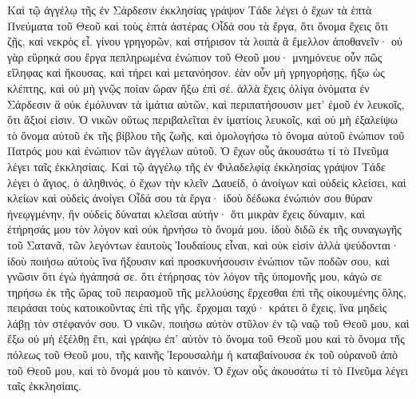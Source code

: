 \begin{pages}
    \begin{Rightside}
        \beginnumbering
		Καὶ τῷ ἀγγέλῳ τῆς ἐν Σάρδεσιν ἐκκλησίας γράψον  Τάδε λέγει ὁ ἔχων τὰ ἑπτὰ Πνεύματα τοῦ Θεοῦ καὶ τοὺς ἑπτὰ ἀστέρας Οἶδά σου τὰ ἔργα, ὅτι ὄνομα ἔχεις ὅτι ζῇς, καὶ νεκρὸς εἶ. γίνου γρηγορῶν, καὶ στήρισον τὰ λοιπὰ ἃ ἔμελλον ἀποθανεῖν· οὐ γὰρ εὕρηκά σου ἔργα πεπληρωμένα ἐνώπιον τοῦ Θεοῦ μου· μνημόνευε οὖν πῶς εἴληφας καὶ ἤκουσας, καὶ τήρει καὶ μετανόησον. ἐὰν οὖν μὴ γρηγορήσῃς, ἥξω ὡς κλέπτης, καὶ οὐ μὴ γνῷς ποίαν ὥραν ἥξω ἐπὶ σέ.
		\pend
		\pstart
		ἀλλὰ ἔχεις ὀλίγα ὀνόματα ἐν Σάρδεσιν ἃ οὐκ ἐμόλυναν τὰ ἱμάτια αὐτῶν, καὶ περιπατήσουσιν μετ’ ἐμοῦ ἐν λευκοῖς, ὅτι ἄξιοί εἰσιν. Ὁ νικῶν οὕτως περιβαλεῖται ἐν ἱματίοις λευκοῖς, καὶ οὐ μὴ ἐξαλείψω τὸ ὄνομα αὐτοῦ ἐκ τῆς βίβλου τῆς ζωῆς, καὶ ὁμολογήσω τὸ ὄνομα αὐτοῦ ἐνώπιον τοῦ Πατρός μου καὶ ἐνώπιον τῶν ἀγγέλων αὐτοῦ. Ὁ ἔχων οὖς ἀκουσάτω τί τὸ Πνεῦμα λέγει ταῖς ἐκκλησίαις.
		\pend
		\pstart
		Καὶ τῷ ἀγγέλῳ τῆς ἐν Φιλαδελφίᾳ ἐκκλησίας γράψον Τάδε λέγει ὁ ἅγιος, ὁ ἀληθινός, ὁ ἔχων τὴν κλεῖν Δαυείδ, ὁ ἀνοίγων καὶ οὐδεὶς κλείσει, καὶ κλείων καὶ οὐδεὶς ἀνοίγει Οἶδά σου τὰ ἔργα· ἰδοὺ δέδωκα ἐνώπιόν σου θύραν ἠνεῳγμένην, ἣν οὐδεὶς δύναται κλεῖσαι αὐτήν· ὅτι μικρὰν ἔχεις δύναμιν, καὶ ἐτήρησάς μου τὸν λόγον καὶ οὐκ ἠρνήσω τὸ ὄνομά μου. ἰδοὺ διδῶ ἐκ τῆς συναγωγῆς τοῦ Σατανᾶ, τῶν λεγόντων ἑαυτοὺς Ἰουδαίους εἶναι, καὶ οὐκ εἰσὶν ἀλλὰ ψεύδονται· ἰδοὺ ποιήσω αὐτοὺς ἵνα ἥξουσιν καὶ προσκυνήσουσιν ἐνώπιον τῶν ποδῶν σου, καὶ γνῶσιν ὅτι ἐγὼ ἠγάπησά σε. ὅτι ἐτήρησας τὸν λόγον τῆς ὑπομονῆς μου, κἀγώ σε τηρήσω ἐκ τῆς ὥρας τοῦ πειρασμοῦ τῆς μελλούσης ἔρχεσθαι ἐπὶ τῆς οἰκουμένης ὅλης, πειράσαι τοὺς κατοικοῦντας ἐπὶ τῆς γῆς. ἔρχομαι ταχύ· κράτει ὃ ἔχεις, ἵνα μηδεὶς λάβῃ τὸν στέφανόν σου. Ὁ νικῶν, ποιήσω αὐτὸν στῦλον ἐν τῷ ναῷ τοῦ Θεοῦ μου, καὶ ἔξω οὐ μὴ ἐξέλθῃ ἔτι, καὶ γράψω ἐπ’ αὐτὸν τὸ ὄνομα τοῦ Θεοῦ μου καὶ τὸ ὄνομα τῆς πόλεως τοῦ Θεοῦ μου, τῆς καινῆς Ἱερουσαλὴμ ἡ καταβαίνουσα ἐκ τοῦ οὐρανοῦ ἀπὸ τοῦ Θεοῦ μου, καὶ τὸ ὄνομά μου τὸ καινόν. Ὁ ἔχων οὖς ἀκουσάτω τί τὸ Πνεῦμα λέγει ταῖς ἐκκλησίαις.
		\pend
		\pstart

\end{Rightside}
\end{pages}
